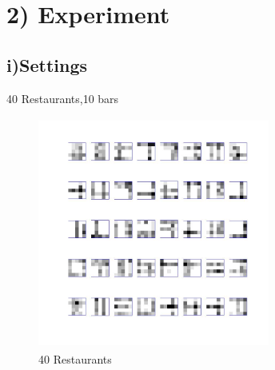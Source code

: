 \documentclass{article}
\begin{document}
\begin{spacing}{1.1}
\begin{enumerate}[(I)]
\end{enumerate}



\section{2) Experiment}
\subsection{i)Settings}
40 Restaurants,10 bars\\
\begin{figure}
    \centering 
    \includegraphics[width=3in,height=3in]{restau.jpg} 
    \caption{40 Restaurants}
\end{figure}


\end{spacing}
\end{document}
